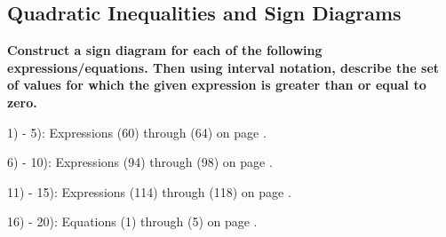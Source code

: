 \documentclass[12pt]{book}
\theoremstyle{definition}
\begin{document}
\subsection*{Quadratic Inequalities and Sign Diagrams}

{\bf Construct a sign diagram for each of the following expressions/equations.  Then using interval notation, describe the set of values for which the given expression is greater than or equal to zero.}\par

1) - 5): Expressions (60) through (64) on page \pageref{ais1}.\par

6) - 10): Expressions (94) through (98) on page \pageref{aisnot1}.\par

11) - 15): Expressions (114) through (118) on page \pageref{aisnot1}.\par

16) - 20): Equations (1) through (5) on page \pageref{QF}.
\end{document}

